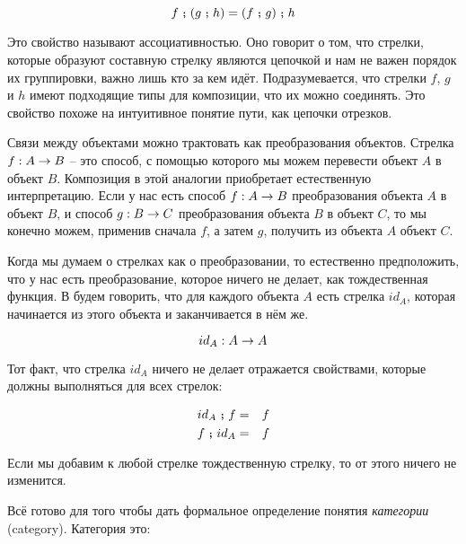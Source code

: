 \[ f \footnotesize\textbf{~;~}\normalsize (g \footnotesize\textbf{~;~}\normalsize h) = (f \footnotesize\textbf{~;~}\normalsize g) \footnotesize\textbf{~;~}\normalsize h \]

Это свойство называют ассоциативностью. Оно говорит о том,
что стрелки, которые образуют составную стрелку являются
цепочкой и нам не важен порядок их группировки, важно
лишь кто за кем идёт. Подразумевается, что стрелки $f$, $g$
и $h$ имеют подходящие типы для композиции, что их можно
соединять. Это свойство похоже на интуитивное понятие
пути, как цепочки отрезков. 

Связи между объектами можно трактовать как преобразования
объектов. Стрелка $f : A \rightarrow B$ -- это способ, с помощью которого
мы можем перевести объект $A$ в объект $B$. Композиция 
в этой аналогии приобретает естественную интерпретацию. Если 
у нас есть способ $f : A \rightarrow B$ преобразования объекта
$A$ в объект $B$, и способ $g : B \rightarrow C$ преобразования 
объекта $B$ в объект $C$, то мы конечно можем, применив
сначала $f$, а затем $g$, получить из объекта $A$ объект $C$.

Когда мы думаем о стрелках как о преобразовании, то 
естественно предположить, что у нас есть преобразование,
которое ничего не делает, как тождественная функция. 
В будем говорить, что для каждого объекта $A$ есть стрелка $id_A$,
которая начинается из этого объекта и заканчивается в нём же.

\[ id_A : A \rightarrow A \]

Тот факт, что стрелка $id_A$ ничего не делает отражается
свойствами, которые должны выполняться для всех стрелок:

\begin{eqnarray*}
id_A \footnotesize\textbf{~;~}\normalsize f &=& f \\
f \footnotesize\textbf{~;~}\normalsize id_A &=& f \\
\end{eqnarray*}

Если мы добавим к любой стрелке тождественную стрелку,
то от этого ничего не изменится. 

Всё готово для того чтобы дать формальное определение понятия
 \emph{категории} (category). Категория это:

